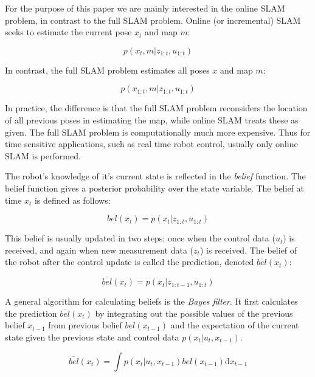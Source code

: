 For the purpose of this paper we are mainly interested in the online SLAM problem, in contrast to the full SLAM problem. Online (or incremental) SLAM seeks to estimate the current pose $x_{t}$ and map $m$:

\begin{equation}
p(x_{t}, m | z_{1:t}, u_{1:t})
\end{equation}

In contrast, the full SLAM problem estimates all poses $x$ and map $m$:

\begin{equation}
p(x_{1:t}, m | z_{1:t}, u_{1:t})
\end{equation}

In practice, the difference is that the full SLAM problem reconsiders the location of all previous poses in estimating the map, while online SLAM treats these as given. The full SLAM problem is computationally much more expensive. Thus for time sensitive applications, such as real time robot control, usually only online SLAM is performed.

The robot's knowledge of it's current state is reflected in the \emph{belief} function. The belief function gives a posterior probability over the state variable. The belief at time $x_t$ is defined as follows:

\begin{equation}
bel(x_t) = p(x_t | z_{1:t}, u_{1:t})
\end{equation}

This belief is usually updated in two steps: once when the control data ($u_t$) is received, and again when new measurement data ($z_t$) is received. The belief of the robot after the control update is called the prediction, denoted $\overline{bel}(x_t)$:

\begin{equation}
\overline{bel}(x_t) = p(x_t | z_{1:t-1}, u_{1:t})
\end{equation}

A general algorithm for calculating beliefs is the \emph{Bayes filter}. It first calculates the prediction $\overline{bel}(x_t)$ by integrating out the possible values of the previous belief $x_{t-1}$ from previous belief $bel(x_{t-1})$ and the expectation of the current state given the previous state and control data $p(x_t|u_t, x_{t-1})$.

\begin{equation}
\overline{bel}(x_t) = \int p(x_t|u_t, x_{t-1})bel(x_{t-1})\mathrm{d}x_{t-1}
\end{equation}


